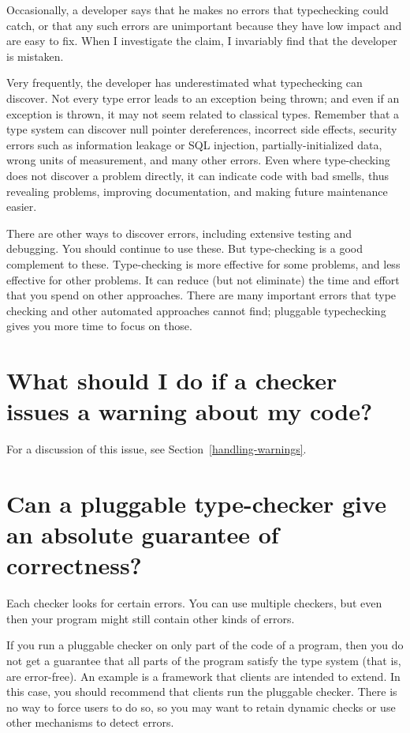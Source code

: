 Occasionally, a developer says that he makes no errors that typechecking
could catch, or that any such errors are unimportant because they have low
impact and are easy to fix.  When I investigate the claim, I invariably
find that the developer is mistaken.

Very frequently, the developer has underestimated what typechecking can
discover.  Not every type error leads to an exception being thrown; and
even if an exception is thrown, it may not seem related to classical types.
Remember that a type system can discover
null pointer dereferences,
incorrect side effects, 
security errors such as information leakage or SQL injection,
partially-initialized data,
wrong units of measurement,
and many other errors.  Even where type-checking does not discover a
problem directly, it can indicate code with bad smells, thus revealing
problems, improving documentation, and making future maintenance easier.

There are other ways to discover errors, including extensive testing and
debugging.  You should continue to use these.
But type-checking is a good complement to these.  Type-checking is more
effective for some problems, and less effective for other problems.  It can
reduce (but not eliminate) the time and effort that you spend on other
approaches.  There are many important errors that type checking and other
automated approaches cannot find; pluggable typechecking gives you more
time to focus on those.


\section{What should I do if a checker issues a warning about my code?\label{faq-handling-warnings}}

For a discussion of this issue, see Section~\ref{handling-warnings}.


\section{Can a pluggable type-checker give an absolute guarantee of correctness?\label{faq-no-absolute-guarantee}}

Each checker looks for certain errors.  You can use multiple checkers, but
even then your program might still contain other kinds of errors.

If you run a pluggable checker on only part of the code of a program, then
you do not get a guarantee that all parts of the program satisfy the type
system (that is, are error-free).  An example is a framework that clients
are intended to extend.  In this case, you should recommend that clients
run the pluggable checker.  There is no way to force users to do so, so you
may want to retain dynamic checks or use other mechanisms to detect errors.

